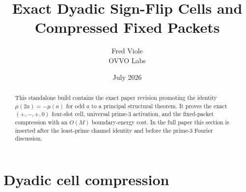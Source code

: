 \documentclass[11pt]{article}
\title{Exact Dyadic Sign-Flip Cells and Compressed Fixed Packets}
\author{Fred Viole\\OVVO Labs}
\date{July 2026}
\theoremstyle{definition}
\newcommand{\1}{\mathbf{1}}
\begin{document}
\maketitle

\begin{abstract}
This standalone build contains the exact paper revision promoting the identity
$\mu(2a)=-\mu(a)$ for odd $a$ to a principal structural theorem.  It proves
the exact $(+,-,+,0)$ four-slot cell, universal prime-$3$ activation, and the
fixed-packet compression with an $O(M)$ boundary-energy cost.  In the full
paper this section is inserted after the least-prime channel identity and
before the prime-$3$ Fourier discussion.
\end{abstract}

\section{Dyadic cell compression}

\end{document}
